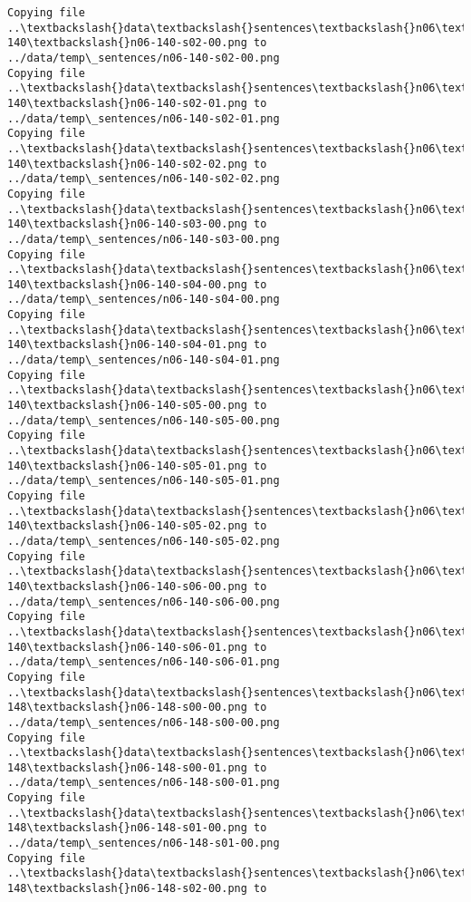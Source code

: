 \documentclass[11pt]{article}
\begin{document}
\begin{Verbatim}[commandchars=\\\{\}]
Copying file ..\textbackslash{}data\textbackslash{}sentences\textbackslash{}n06\textbackslash{}n06-140\textbackslash{}n06-140-s02-00.png to
../data/temp\_sentences/n06-140-s02-00.png
Copying file ..\textbackslash{}data\textbackslash{}sentences\textbackslash{}n06\textbackslash{}n06-140\textbackslash{}n06-140-s02-01.png to
../data/temp\_sentences/n06-140-s02-01.png
Copying file ..\textbackslash{}data\textbackslash{}sentences\textbackslash{}n06\textbackslash{}n06-140\textbackslash{}n06-140-s02-02.png to
../data/temp\_sentences/n06-140-s02-02.png
Copying file ..\textbackslash{}data\textbackslash{}sentences\textbackslash{}n06\textbackslash{}n06-140\textbackslash{}n06-140-s03-00.png to
../data/temp\_sentences/n06-140-s03-00.png
Copying file ..\textbackslash{}data\textbackslash{}sentences\textbackslash{}n06\textbackslash{}n06-140\textbackslash{}n06-140-s04-00.png to
../data/temp\_sentences/n06-140-s04-00.png
Copying file ..\textbackslash{}data\textbackslash{}sentences\textbackslash{}n06\textbackslash{}n06-140\textbackslash{}n06-140-s04-01.png to
../data/temp\_sentences/n06-140-s04-01.png
Copying file ..\textbackslash{}data\textbackslash{}sentences\textbackslash{}n06\textbackslash{}n06-140\textbackslash{}n06-140-s05-00.png to
../data/temp\_sentences/n06-140-s05-00.png
Copying file ..\textbackslash{}data\textbackslash{}sentences\textbackslash{}n06\textbackslash{}n06-140\textbackslash{}n06-140-s05-01.png to
../data/temp\_sentences/n06-140-s05-01.png
Copying file ..\textbackslash{}data\textbackslash{}sentences\textbackslash{}n06\textbackslash{}n06-140\textbackslash{}n06-140-s05-02.png to
../data/temp\_sentences/n06-140-s05-02.png
Copying file ..\textbackslash{}data\textbackslash{}sentences\textbackslash{}n06\textbackslash{}n06-140\textbackslash{}n06-140-s06-00.png to
../data/temp\_sentences/n06-140-s06-00.png
Copying file ..\textbackslash{}data\textbackslash{}sentences\textbackslash{}n06\textbackslash{}n06-140\textbackslash{}n06-140-s06-01.png to
../data/temp\_sentences/n06-140-s06-01.png
Copying file ..\textbackslash{}data\textbackslash{}sentences\textbackslash{}n06\textbackslash{}n06-148\textbackslash{}n06-148-s00-00.png to
../data/temp\_sentences/n06-148-s00-00.png
Copying file ..\textbackslash{}data\textbackslash{}sentences\textbackslash{}n06\textbackslash{}n06-148\textbackslash{}n06-148-s00-01.png to
../data/temp\_sentences/n06-148-s00-01.png
Copying file ..\textbackslash{}data\textbackslash{}sentences\textbackslash{}n06\textbackslash{}n06-148\textbackslash{}n06-148-s01-00.png to
../data/temp\_sentences/n06-148-s01-00.png
Copying file ..\textbackslash{}data\textbackslash{}sentences\textbackslash{}n06\textbackslash{}n06-148\textbackslash{}n06-148-s02-00.png to

\end{Verbatim}
\end{document}
